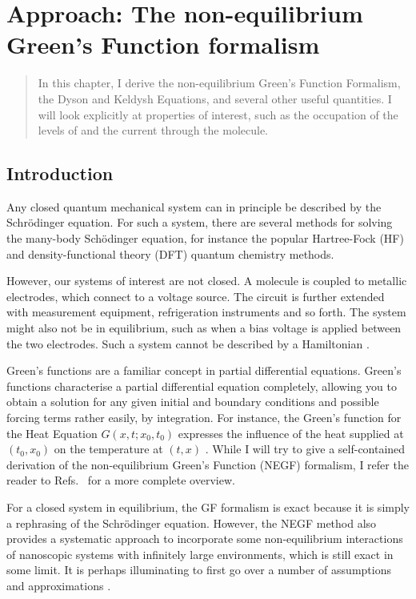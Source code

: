 \chapter{Approach: The non-equilibrium Green's Function formalism}
\label{ch:chapter_2}

\begin{abstract}
In this chapter, I derive the non-equilibrium Green's Function Formalism, the Dyson and Keldysh Equations, and several other useful quantities. I will look explicitly at properties of interest, such as the occupation of the levels of and the current through the molecule.
\end{abstract}

\newpage
\section{Introduction}
Any closed quantum mechanical system can in principle be described by the Schr\"odinger equation. For such a system, there are several methods for solving the many-body Sch\"odinger equation, for instance the popular Hartree-Fock (HF) and density-functional theory (DFT) quantum chemistry methods.

However, our systems of interest are not closed. A molecule is coupled to metallic electrodes, which connect to a voltage source. The circuit is further extended with measurement equipment, refrigeration instruments and so forth. The system might also not be in equilibrium, such as when a bias voltage is applied between the two electrodes. Such a system cannot be described by a Hamiltonian \cite{seldenthuis}.

Green's functions are a familiar concept in partial differential equations. Green's functions characterise a partial differential equation completely, allowing you to obtain a solution for any given initial and boundary conditions and possible forcing terms rather easily, by integration. For instance, the Green's function for the Heat Equation $G(x,t; x_0, t_0)$ expresses the influence of the heat supplied at $(t_0, x_0)$ on the temperature at $(t,x)$ \cite{haberman}. 
While I will try to give a self-contained derivation of the non-equilibrium Green's Function (NEGF) formalism, I refer the reader to Refs.~\cite{mattuck,diventra,haugjauho, leeuwen} for a more complete overview.

For a closed system in equilibrium, the GF formalism is exact because it is simply a rephrasing of the Schr\"odinger equation. However, the NEGF method also provides a systematic approach to incorporate some non-equilibrium interactions of nanoscopic systems with infinitely large environments, which is still exact in some limit. It is perhaps illuminating to first go over a number of assumptions and approximations \cite{seldenthuis}. 

